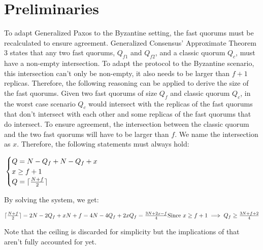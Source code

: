 \section{Preliminaries}

To adapt Generalized Paxos to the Byzantine setting, the fast quorums must be recalculated to ensure agreement. Generalized Consensus' Approximate Theorem 3 states that any two fast quorums, $Q_{f1}$ and $Q_{f2}$, and a classic quorum $Q_c$, must have a non-empty intersection. To adapt the protocol to the Byzantine scenario, this intersection can't only be non-empty, it also needs to be larger than $f+1$ replicas. Therefore, the following reasoning can be applied to derive the size of the fast quorums. Given two fast quorums of size $Q_f$ and classic quorum $Q_c$, in the worst case scenario $Q_c$ would intersect with the replicas of the fast quorums that don't intersect with each other and some replicas of the fast quorums that do intersect. To ensure agreement, the intersection between the classic quorum and the two fast quorums will have to be larger than $f$. We name the intersection as $x$. Therefore, the following statements must always hold:

$\\ \begin{cases}
		Q = N - Q_f + N-Q_f + x \\
		x \geq f +1 \\
		Q = \lceil \frac{N+f}{2}\rceil
\end{cases} \\$

By solving the system, we get:

$\lceil\frac{N+f}{2}\rceil = 2N - 2Q_f + x \\
N+f = 4N - 4Q_f + 2x \\
Q_f = \frac{3N+2x-f}{4} \\ 
\text{Since $x \geq f+1$} \implies Q_f \geq \frac{3N+f+2}{4} \\$


\par
Note that the ceiling is discarded for simplicity but the implications of that aren't fully accounted for yet.
